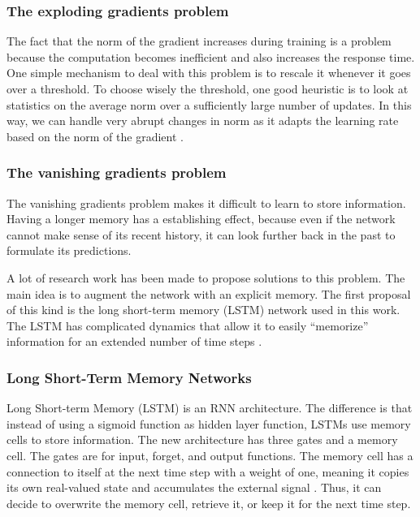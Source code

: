 \subsubsection*{The exploding gradients problem}
 The fact that the norm of the gradient increases during training is a problem because the computation becomes inefficient and also increases the response time. One simple mechanism to deal with this problem is to rescale it whenever it goes over a threshold. To choose wisely the threshold, one good heuristic is to look at statistics on the average norm over a sufficiently large number of updates. In this way, we can handle very abrupt changes in norm as it adapts the learning rate based on the norm of the gradient  \cite{pascanu2013difficulty}.

\subsubsection*{The vanishing gradients problem}

The vanishing gradients problem makes it difficult to learn to store information. Having a longer memory has a establishing effect, because even if the network cannot make sense of its recent history, it can look further back in the past to formulate its predictions. \cite{graves2013generating}


A lot of research work has been made to propose solutions to this problem. The main idea is to augment the network with an explicit memory. The first proposal of this kind is the long short-term memory (LSTM) network used in this work. The LSTM has complicated dynamics that allow it to easily “memorize” information for an extended number of time steps \cite{zaremba2014recurrent}.

\subsubsection{Long Short-Term Memory Networks}
Long Short-term Memory (LSTM) is an RNN architecture. The difference is that instead of using a sigmoid function as hidden layer function, LSTMs use memory cells to store information. The new architecture has three gates and a memory cell. The gates are for input, forget, and output functions. The memory cell has a connection to itself at the next time step with a weight of one, meaning it copies its own real-valued state and accumulates the external signal \cite{lecun2015deep}. Thus, it can decide to overwrite the memory cell, retrieve it, or keep it for the next time step\cite{zaremba2014recurrent}. 

